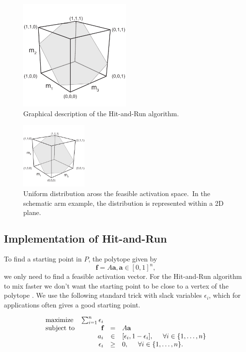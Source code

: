 \begin{figure}[h]
\centering
\includegraphics[width=0.5\textwidth,page=10]{sections/figs/HitandRunSchematics_all.pdf}
\caption{Graphical description of the Hit-and-Run algorithm.}
\label{fig:hitruncube}
\end{figure}

\begin{figure}[h]
\centering
\includegraphics[width=0.3\textwidth,page=9]{sections/figs/HitandRunSchematics_all.pdf}
\caption{Uniform distribution aross the feasible activation space.\ In the schematic arm example, the distribution is represented within a 2D plane.}
\label{fig:posthitrun_distribution}
\end{figure}

\subsection{Implementation of Hit-and-Run}
To find a starting point in $P$, the polytope given by
\[\textbf{f} = A\textbf{a}, \textbf{a} \in [0,1]^n,\]
we only need to find a feasible activation vector.
For the Hit-and-Run algorithm to mix faster we don't want the starting point to be close to a vertex of the polytope \cite{Lovasz}.
We use the following standard trick with slack variables $\epsilon_i$, which for applications often gives a good starting point.

\begin{equation}\label{eq:LP_r}
\begin{array}{lrcl}
\mbox{maximize} & \sum_{i=1}^n \epsilon_i \\ 
\mbox{subject to} & \textbf{f} &=& A\textbf{a}\\
  & a_i &\in& [\epsilon_i, 1- \epsilon_i], \hspace{5mm} \forall i \in \{1,\dots,n\}  \\
  & \epsilon_i &\geq& 0, \hspace{5mm} \forall i \in \{1,\dots,n\}.  
\end{array}
\end{equation}


